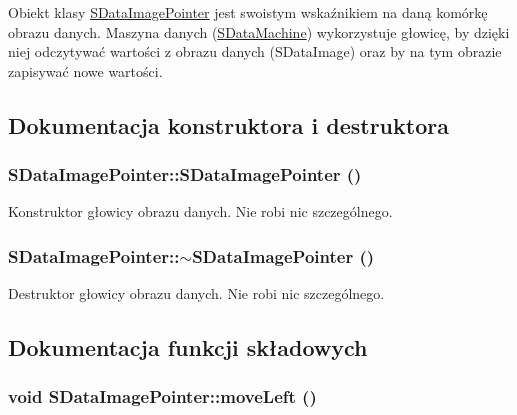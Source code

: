 Obiekt klasy \hyperlink{classSDataImagePointer}{SDataImagePointer} jest swoistym wskaźnikiem na daną komórkę obrazu danych. Maszyna danych (\hyperlink{classSDataMachine}{SDataMachine}) wykorzystuje głowicę, by dzięki niej odczytywać wartości z obrazu danych (SDataImage) oraz by na tym obrazie zapisywać nowe wartości. 

\subsection{Dokumentacja konstruktora i destruktora}
\hypertarget{classSDataImagePointer_2ffb42e886f442004cd21617a6ea034d}{
\subsubsection[{SDataImagePointer}]{\setlength{\rightskip}{0pt plus 5cm}SDataImagePointer::SDataImagePointer ()}}
\label{classSDataImagePointer_2ffb42e886f442004cd21617a6ea034d}


Konstruktor głowicy obrazu danych. Nie robi nic szczególnego. \hypertarget{classSDataImagePointer_8f96c4dc8dc25e0ff5cccb2e693ffcc8}{
\subsubsection[{$\sim$SDataImagePointer}]{\setlength{\rightskip}{0pt plus 5cm}SDataImagePointer::$\sim$SDataImagePointer ()}}
\label{classSDataImagePointer_8f96c4dc8dc25e0ff5cccb2e693ffcc8}


Destruktor głowicy obrazu danych. Nie robi nic szczególnego. 

\subsection{Dokumentacja funkcji składowych}
\hypertarget{classSDataImagePointer_811380aecd0dc422333dcdcd41f91ba7}{
\subsubsection[{moveLeft}]{\setlength{\rightskip}{0pt plus 5cm}void SDataImagePointer::moveLeft ()}}
\label{classSDataImagePointer_811380aecd0dc422333dcdcd41f91ba7}


